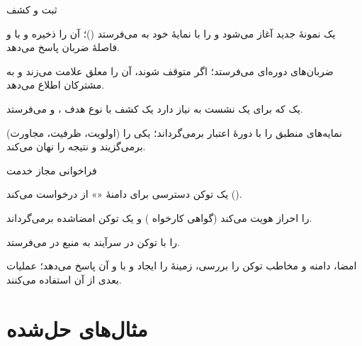 \documentclass[11pt,a4paper]{article}
\begin{document}
\begin{procedurebox}{ثبت و کشف }\label{proc:register}
\begin{steps}
  \item یک نمونهٔ جدید  آغاز می‌شود و  را با نمایهٔ  خود به  می‌فرستد
        ()؛  آن را ذخیره و با  و فاصلهٔ ضربان پاسخ می‌دهد.
  \item {} ضربان‌های دوره‌ای می‌فرستد؛ اگر متوقف شوند،  آن را معلق علامت می‌زند و به مشترکان اطلاع می‌دهد.
  \item یک  که برای یک نشست  به  نیاز دارد یک  کشف با نوع هدف ،  و
         می‌فرستد.
  \item {} نمایه‌های منطبق را با دورهٔ اعتبار برمی‌گرداند؛  یکی را (اولویت، ظرفیت، مجاورت) برمی‌گزیند و نتیجه را
        نهان می‌کند.
\end{steps}
\end{procedurebox}

\begin{procedurebox}{فراخوانی مجاز خدمت}\label{proc:invoke}
\begin{steps}
  \item {} یک توکن دسترسی برای دامنهٔ «» از  درخواست می‌کند ().
  \item {}  را احراز هویت می‌کند (گواهی کارخواه ) و یک توکن امضاشده برمی‌گرداند.
  \item {}  را با توکن در سرآیند  به منبع  در  می‌فرستد.
  \item {} امضا، دامنه و مخاطب توکن را بررسی، زمینهٔ  را ایجاد و با  و  آن پاسخ می‌دهد؛ عملیات
        بعدی از آن  استفاده می‌کنند.
\end{steps}
\end{procedurebox}

\begin{acnfigure}
  \caption{ثبت، کشف، توکن و فراخوانی خدمت (\cref{proc:register,proc:invoke}).}
  \label{fig:nrf}
\end{acnfigure}

\section{مثال‌های حل‌شده}
\end{document}
